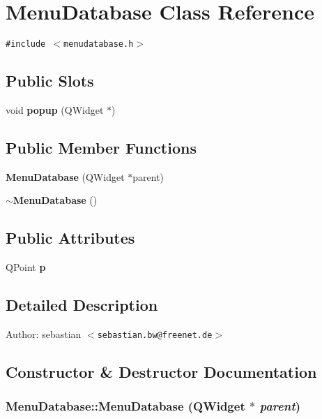 \section{Menu\-Database Class Reference}
\label{classMenuDatabase}
{\tt \#include $<$menudatabase.h$>$}

\subsection*{Public Slots}
\begin{CompactItemize}
\item 
void {\bf popup} (QWidget $\ast$)
\end{CompactItemize}
\subsection*{Public Member Functions}
\begin{CompactItemize}
\item 
{\bf Menu\-Database} (QWidget $\ast$parent)
\item 
{\bf $\sim$Menu\-Database} ()
\end{CompactItemize}
\subsection*{Public Attributes}
\begin{CompactItemize}
\item 
QPoint {\bf p}
\end{CompactItemize}


\subsection{Detailed Description}
\begin{Desc}
\item[Author:]sebastian $<${\tt sebastian.bw@freenet.de}$>$ \end{Desc}




\subsection{Constructor \& Destructor Documentation}
\subsubsection{\setlength{\rightskip}{0pt plus 5cm}Menu\-Database::Menu\-Database (QWidget $\ast$ {\em parent})}\label{classMenuDatabase_5c3bd10f85851497c83cb770f1b209b6}


